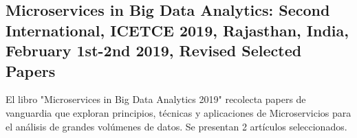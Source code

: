
\subsection{Microservices in Big Data Analytics: Second International, {ICETCE} 2019, Rajasthan, India, February 1st-2nd 2019, Revised Selected Papers
}

El libro "Microservices in Big Data Analytics 2019"\cite{chaudharyMicroservices2020} recolecta papers de vanguardia que exploran principios, técnicas y aplicaciones de Microservicios para el análisis de grandes volúmenes de datos.
Se presentan 2 artículos seleccionados.\par



